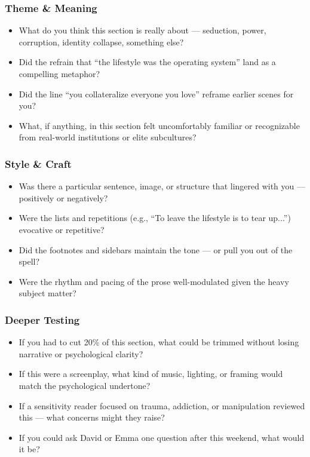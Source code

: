 \subsubsection{Theme \& Meaning}

\begin{itemize}
\item What do you think this section is really about — seduction, power, corruption, identity collapse, something else?
\item Did the refrain that “the lifestyle was the operating system” land as a compelling metaphor?
\item Did the line “you collateralize everyone you love” reframe earlier scenes for you?
\item What, if anything, in this section felt uncomfortably familiar or recognizable from real-world institutions or elite subcultures?
\end{itemize}

\subsubsection{Style \& Craft}

\begin{itemize}
\item Was there a particular sentence, image, or structure that lingered with you — positively or negatively?
\item Were the lists and repetitions (e.g., “To leave the lifestyle is to tear up...”) evocative or repetitive?
\item Did the footnotes and sidebars maintain the tone — or pull you out of the spell?
\item Were the rhythm and pacing of the prose well-modulated given the heavy subject matter?
\end{itemize}

\subsubsection{Deeper Testing}

\begin{itemize}
\item If you had to cut 20\% of this section, what could be trimmed without losing narrative or psychological clarity?
\item If this were a screenplay, what kind of music, lighting, or framing would match the psychological undertone?
\item If a sensitivity reader focused on trauma, addiction, or manipulation reviewed this — what concerns might they raise?
\item If you could ask David or Emma one question after this weekend, what would it be?
\end{itemize}




